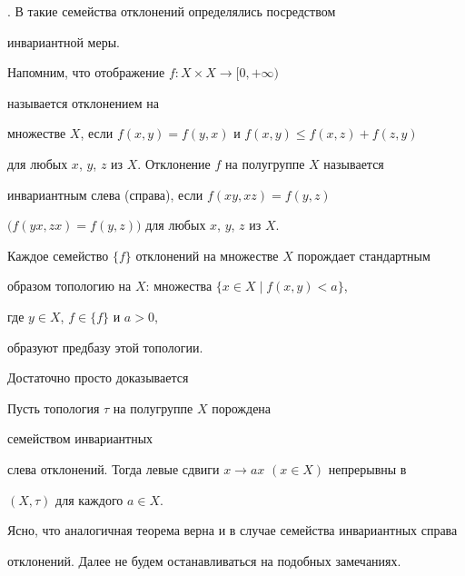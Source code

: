 \cite{Bu}. В \cite{Mu} такие семейства отклонений определялись посредством 


инвариантной меры. 


 


Напомним, что отображение $f:X\times X\to[0,+\infty)$ 


называется отклонением на 


множестве $X$, если $f(x,y)=f(y,x)$ и $f(x,y)\le f(x,z)+f(z,y)$ 


для любых $x$, $y$, $z$ из $X$. Отклонение $f$ на полугруппе $X$ называется 


инвариантным слева (справа), если $f(xy,xz)=f(y,z)$ 


$\bigl(f(yx,zx)=f(y,z)\bigr)$ для любых $x$, $y$, $z$ из $X$. 


 


Каждое семейство $\{f\}$ отклонений на множестве $X$ порождает стандартным 


образом топологию на $X$: множества $\{x\in X\mid f(x,y)<a\}$, 


где $y\in X$, $f\in\{f\}$ и $a>0$, 


образуют предбазу этой топологии. 


Достаточно просто доказывается 


 


\begin{thm} Пусть топология $\tau$ на полугруппе $X$ порождена


семейством инвариантных 


слева отклонений. Тогда левые сдвиги $x\to ax$ $(x\in X)$ непрерывны в 


$(X,\tau)$ для каждого $a\in X$. 


\end{thm} 


 


Ясно, что аналогичная теорема верна и в случае семейства инвариантных справа 


отклонений. Далее не будем останавливаться на подобных замечаниях. 


 


